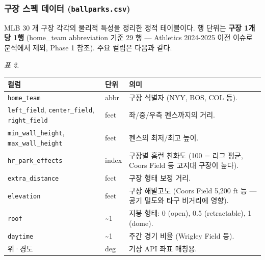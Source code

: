 \documentclass[
  11.5pt,
]{article}
\begin{document}
\subsubsection{\texorpdfstring{구장 스펙 데이터
(\texttt{ballparks.csv})}{구장 스펙 데이터 (ballparks.csv)}}\label{uxad6cuxc7a5-uxc2a4uxd399-uxb370uxc774uxd130-ballparks.csv}

MLB 30 개 구장 각각의 물리적 특성을 정리한 정적 테이블이다. 행 단위는
\textbf{구장 1개당 1행} (home\_team abbreviation 기준 29 행 ---
Athletics 2024-2025 이전 이슈로 분석에서 제외, Phase 1 참조). 주요
컬럼은 다음과 같다.

\emph{표 2.}

\begin{longtable}[]{@{}
  >{\raggedright\arraybackslash}p{}
  >{\raggedright\arraybackslash}p{}
  >{\raggedright\arraybackslash}p{}@{}}
\toprule\noalign{}
\begin{minipage}[b]{\linewidth}\raggedright
컬럼
\end{minipage} & \begin{minipage}[b]{\linewidth}\raggedright
단위
\end{minipage} & \begin{minipage}[b]{\linewidth}\raggedright
의미
\end{minipage} \\
\midrule\noalign{}
\endhead
\bottomrule\noalign{}
\endlastfoot
\texttt{home\_team} & abbr & 구장 식별자 (NYY, BOS, COL 등). \\
\texttt{left\_field}, \texttt{center\_field}, \texttt{right\_field} &
feet & 좌/중/우측 펜스까지의 거리. \\
\texttt{min\_wall\_height}, \texttt{max\_wall\_height} & feet & 펜스의
최저/최고 높이. \\
\texttt{hr\_park\_effects} & index & 구장별 홈런 친화도 (100 = 리그
평균, Coors Field 등 고지대 구장이 높다). \\
\texttt{extra\_distance} & feet & 구장 형태 보정 거리. \\
\texttt{elevation} & feet & 구장 해발고도 (Coors Field 5,200 ft 등 ---
공기 밀도와 타구 비거리에 영향). \\
\texttt{roof} & 0\textasciitilde1 & 지붕 형태: 0 (open), 0.5
(retractable), 1 (dome). \\
\texttt{daytime} & 0\textasciitilde1 & 주간 경기 비율 (Wrigley Field
등). \\
위·경도 & deg & 기상 API 좌표 매칭용. \\
\end{longtable}
\end{document}
